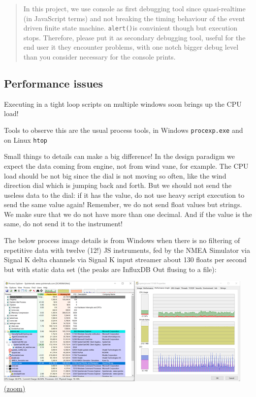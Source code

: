 \documentclass[11pt]{article}
\begin{document}
    \begin{quote}
In this project, we use console as first debugging tool since
quasi-realtime (in JavaScript terms) and not breaking the timing
behaviour of the event driven finite state machine. \texttt{alert()}is
convinient though but execution stops. Therefore, please put it as
secondary debugging tool, useful for the end user it they encounter
problems, with one notch bigger debug level than you consider necessary
for the console prints.
\end{quote}

    \hypertarget{performance-issues}{%
\subsection{Performance issues}\label{performance-issues}}

    Executing in a tight loop scripts on multiple windows soon brings up the
CPU load!

    Tools to observe this are the usual process tools, in Windows
\texttt{procexp.exe} and on Linux \texttt{htop}

    Small things to details can make a big difference! In the design
paradigm we expect the data coming from engine, not from wind vane, for
example. The CPU load should be not big since the dial is not moving so
often, like the wind direction dial which is jumping back and forth. But
we should not send the useless data to the dial: if it has the value, do
not use heavy script execution to send the same value again! Remember,
we do not send float values but strings. We make sure that we do not
have more than one decimal. And if the value is the same, do not send it
to the instrument!

    The below process image details is from Windows when there is no
filtering of repetitive data with twelve (12!) JS instruments, fed by
the NMEA Simulator via Signal K delta channels via Signal K input
streamer about 130 floats per second but with static data set (the peaks
are InfluxDB Out flusing to a file):

    \includegraphics{2020-01-20_dgb_procexp_12_instrucjs_clients_alpha_01.png}
\href{img/2020-01-20_dgb_procexp_12_instrucjs_clients_alpha_01.png}{(zoom)}
\end{document}

